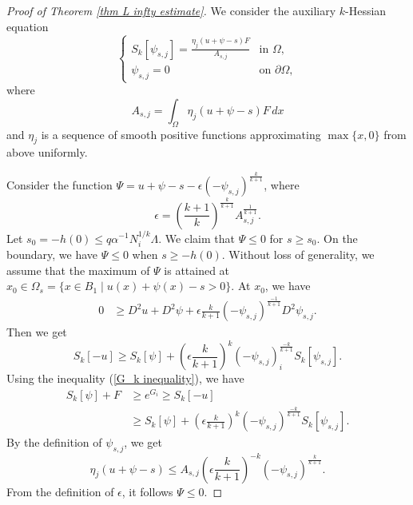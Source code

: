 \documentclass[11pt]{amsart}
\numberwithin{equation}{section}
\numberwithin{equation}{section}
\begin{document}
\begin{proof}[Proof of Theorem \ref{thm L infty estimate}]
We consider the auxiliary $k$-Hessian equation
\[
\begin{cases}
S_k[\psi_{s,j}] = \frac{\eta_j(u+\psi-s) F}{A_{s,j}} & \text{in } \Omega, \\
	\psi_{s,j} = 0 & \text{on } \partial \Omega,
\end{cases}
\]
where 
\[A_{s,j} = \int_{\Omega} \eta_j(u+\psi-s) F \,dx\] 
and $\eta_j $ is a sequence of smooth positive functions approximating $\max\{x,0\}$ from above uniformly.

Consider the function $\Psi = u + \psi - s - \epsilon (-\psi_{s,j})^{\frac{k}{k+1}}$, where 
\[\epsilon=\left(\frac{k+1}{k}\right)^{\frac{k}{k+1}}A_{s,j}^{\frac{1}{k+1}}.\] 
Let $s_0=-h(0)\leq q\alpha^{-1}N_i^{1/k}\Lambda$. We claim that $\Psi\le 0$ for $s\ge s_0$. On the boundary, we have $\Psi\le 0$ when $s\ge -h(0)$. Without loss of generality, we assume that the maximum of $\Psi$ is attained at $x_0 \in \Omega_s = \{ x \in B_1 \mid u(x) + \psi(x) - s > 0 \}$. At $x_0$, we have
\begin{align*}
0&\ge D^2u+D^2\psi+\epsilon\frac{k}{k+1}(-\psi_{s,j})^{\frac{-1}{k+1}}D^2\psi_{s,j}.
\end{align*}
Then we get  
\[S_k[-u]\geq S_k[\psi]+\left(\epsilon\frac{k}{k+1}\right)^k(-\psi_{s,j})^{\frac{-k}{k+1}}_iS_k[\psi_{s,j}].\]
Using the inequality (\ref{G_k inequality}), we have
\begin{align*}
S_k[\psi] +F&\geq e^{G_i}\ge S_k[-u]\\
&\geq  S_k[\psi]+\left(\epsilon\frac{k}{k+1}\right)^k(-\psi_{s,j})^{\frac{-k}{k+1}}S_k[\psi_{s,j}].
\end{align*}
By the definition of $\psi_{s,j}$, we get
\[\eta_j(u+\psi-s)\le A_{s,j}\left(\epsilon\frac{k}{k+1}\right)^{-k}(-\psi_{s,j})^{\frac{k}{k+1}}.\]
From the definition of $\epsilon$, it follows $\Psi\leq 0$.


\end{proof}
\end{document}
